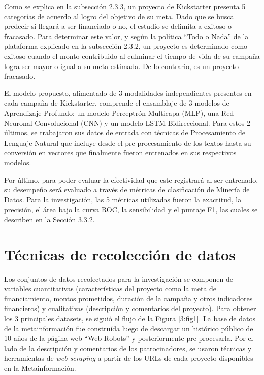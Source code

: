 Como se explica en la subsección 2.3.3, un proyecto de Kickstarter presenta 5 categorías de acuerdo al logro del objetivo de su meta. Dado que se busca predecir si llegará a ser financiado o no, el estudio se delimita a exitoso o fracasado. Para determinar este valor, y según la política “Todo o Nada” de la plataforma explicado en la subsección 2.3.2, un proyecto es determinado como exitoso cuando el monto contribuido al culminar el tiempo de vida de su campaña logra ser mayor o igual a su meta estimada. De lo contrario, es un proyecto fracasado.

El modelo propuesto, alimentado de 3 modalidades independientes presentes en cada campaña de Kickstarter, comprende el ensamblaje de 3 modelos de Aprendizaje Profundo: un modelo Perceptrón Multicapa (MLP), una Red Neuronal Convolucional (CNN) y un modelo LSTM Bidireccional. Para estos 2 últimos, se trabajaron sus datos de entrada con técnicas de Procesamiento de Lenguaje Natural que incluye desde el pre-procesamiento de los textos hasta su conversión en vectores que finalmente fueron entrenados en sus respectivos modelos.

Por último, para poder evaluar la efectividad que este registrará al ser entrenado, su desempeño será evaluado a través de métricas de clasificación de Minería de Datos. Para la investigación, las 5 métricas utilizadas fueron la exactitud, la precisión, el área bajo la curva ROC, la sensibilidad y el puntaje F1, las cuales se describen en la Sección 3.3.2.

\section{Técnicas de recolección de datos}
Los conjuntos de datos recolectados para la investigación se componen de variables cuantitativas (características del proyecto como la meta de financiamiento, montos prometidos, duración de la campaña y otros indicadores financieros) y cualitativas (descripción y comentarios del proyecto). Para obtener los 3 principales datasets, se siguió el flujo de la Figura \ref{3:fig1}. La base de datos de la metainformación fue construída luego de descargar un histórico público de 10 años de la página web “Web Robots” y posteriormente pre-procesarla. Por el lado de la descripción y comentarios de los patrocinadores, se usaron técnicas y herramientas de \textit{web scraping} a partir de los URLs de cada proyecto disponibles en la Metainformación.

